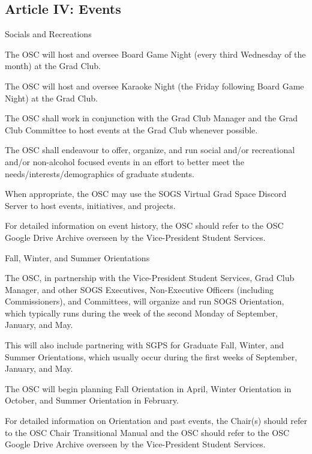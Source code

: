 \subsection{Article IV: Events}
\begin{longenum}[ label*=\thesubsection.\arabic*., align=left] 
	\item Socials and Recreations
		\begin{longenum}[label*=\arabic*., align=left]
		\item The OSC will host and oversee Board Game Night (every third Wednesday of the month) at the Grad Club.
		\item The OSC will host and oversee Karaoke Night (the Friday following Board Game Night) at the Grad Club.		
		\item The OSC shall work in conjunction with the Grad Club Manager and the Grad Club Committee to host events at the Grad Club whenever possible.
		\item The OSC shall endeavour to offer, organize, and run social and/or recreational and/or non-alcohol focused events in an effort to better meet the needs/interests/demographics of graduate students.
		\item When appropriate, the OSC may use the SOGS Virtual Grad Space Discord Server to host events, initiatives, and projects.
		\item For detailed information on event history, the OSC should refer to the OSC Google Drive Archive overseen by the Vice-President Student Services.
		\end{longenum}
	\item Fall, Winter, and Summer Orientations
		\begin{longenum}[label*=\arabic*., align=left]
		\item The OSC, in partnership with the Vice-President Student Services, Grad Club Manager, and other SOGS Executives, Non-Executive Officers (including Commissioners), and Committees, will organize and run SOGS Orientation, which typically runs during the week of the second Monday of September, January, and May.
			\begin{longenum}[label*=\arabic*., align=left]
			\item This will also include partnering with SGPS for Graduate Fall, Winter, and Summer Orientations, which usually occur during the first weeks of September, January, and May.
			\end{longenum}
		\item The OSC will begin planning Fall Orientation in April, Winter Orientation in October, and Summer Orientation in February.
		\item For detailed information on Orientation and past events, the Chair(s) should refer to the OSC Chair Transitional Manual and the OSC should refer to the OSC Google Drive Archive overseen by the Vice-President Student Services.
		\end{longenum}
\end{longenum}





